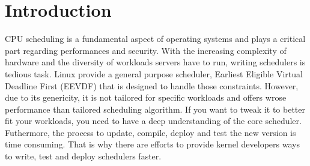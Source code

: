 \section{Introduction}

\par CPU scheduling is a fundamental aspect of operating systems and plays a critical part regarding performances and security. With the increasing complexity of hardware and the diversity of workloads servers have to run, writing schedulers is tedious task. Linux provide a general purpose scheduler, Earliest Eligible Virtual Deadline First (EEVDF) that is designed to handle those constraints. However, due to its genericity, it is not tailored for specific workloads and offers wrose performance than tailored scheduling algorithm.  If you want to tweak it to better fit your workloads, you need to have a deep understanding of the core scheduler. Futhermore, the process to update, compile, deploy and test the new version is time consuming. That is why there are efforts to provide kernel developers ways to write, test and deploy schedulers faster. \newline

